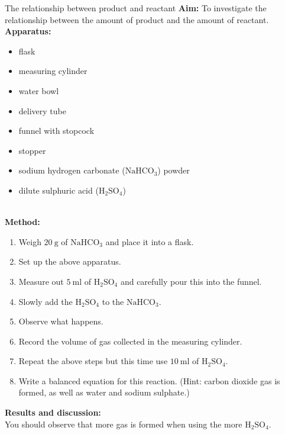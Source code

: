 \begin{g_experiment}{The relationship between product and reactant}
\textbf{Aim:} To investigate the relationship between the amount of product and the amount of reactant.\\
\textbf{Apparatus:}\\
\begin{minipage}{.5\textwidth}
 \begin{itemize}[noitemsep]
  \item flask
\item measuring cylinder
\item water bowl
\item delivery tube
\item funnel with stopcock
\item stopper
\item sodium hydrogen carbonate ($\text{NaHCO}_{3}$) powder
\item dilute sulphuric acid ($\text{H}_{2}\text{SO}_{4}$)
 \end{itemize}
\end{minipage}
\begin{minipage}{.5\textwidth}
\begin{center}
\end{center}
\end{minipage} \\
\textbf{Method:} 
\begin{enumerate}[noitemsep,label=\textbf{\arabic*}]
 \item Weigh $20~\text{g}$ of $\text{NaHCO}_{3}$ and place it into a flask.
\item Set up the above apparatus.
\item Measure out $5~\text{ml}$ of $\text{H}_{2}\text{SO}_{4}$ and carefully pour this into the funnel.
\item Slowly add the $\text{H}_{2}\text{SO}_{4}$ to the $\text{NaHCO}_{3}$.
\item Observe what happens.
\item Record the volume of gas collected in the measuring cylinder.
\item Repeat the above steps but this time use $10~\text{ml}$ of $\text{H}_{2}\text{SO}_{4}$.
\item Write a balanced equation for this reaction. (Hint: carbon dioxide gas is formed, as well as water and sodium sulphate.)
\end{enumerate}
\textbf{Results and discussion:}\\
You should observe that more gas is formed when using the more $\text{H}_{2}\text{SO}_{4}$. 
\end{g_experiment}

